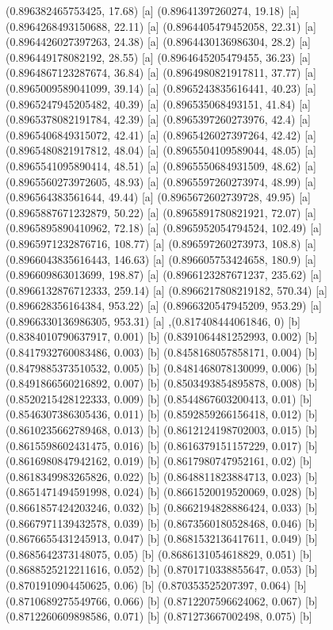 {{{(0.896382465753425, 17.68) [a] 
(0.89641397260274, 19.18) [a] 
(0.8964268493150688, 22.11) [a] 
(0.8964405479452058, 22.31) [a] 
(0.8964426027397263, 24.38) [a] 
(0.8964430136986304, 28.2) [a] 
(0.896449178082192, 28.55) [a] 
(0.8964645205479455, 36.23) [a] 
(0.8964867123287674, 36.84) [a] 
(0.8964980821917811, 37.77) [a] 
(0.8965009589041099, 39.14) [a] 
(0.8965243835616441, 40.23) [a] 
(0.8965247945205482, 40.39) [a] 
(0.896535068493151, 41.84) [a] 
(0.8965378082191784, 42.39) [a] 
(0.8965397260273976, 42.4) [a] 
(0.8965406849315072, 42.41) [a] 
(0.8965426027397264, 42.42) [a] 
(0.8965480821917812, 48.04) [a] 
(0.8965504109589044, 48.05) [a] 
(0.8965541095890414, 48.51) [a] 
(0.8965550684931509, 48.62) [a] 
(0.8965560273972605, 48.93) [a] 
(0.8965597260273974, 48.99) [a] 
(0.896564383561644, 49.44) [a] 
(0.8965672602739728, 49.95) [a] 
(0.8965887671232879, 50.22) [a] 
(0.8965891780821921, 72.07) [a] 
(0.8965895890410962, 72.18) [a] 
(0.8965952054794524, 102.49) [a] 
(0.8965971232876716, 108.77) [a] 
(0.896597260273973, 108.8) [a] 
(0.8966043835616443, 146.63) [a] 
(0.896605753424658, 180.9) [a] 
(0.896609863013699, 198.87) [a] 
(0.8966123287671237, 235.62) [a] 
(0.8966132876712333, 259.14) [a] 
(0.8966217808219182, 570.34) [a] 
(0.896628356164384, 953.22) [a] 
(0.8966320547945209, 953.29) [a] 
(0.8966330136986305, 953.31) [a] 
},{(0.817408444061846, 0) [b] 
(0.8384010790637917, 0.001) [b] 
(0.8391064481252993, 0.002) [b] 
(0.8417932760083486, 0.003) [b] 
(0.8458168057858171, 0.004) [b] 
(0.8479885373510532, 0.005) [b] 
(0.8481468078130099, 0.006) [b] 
(0.8491866560216892, 0.007) [b] 
(0.8503493854895878, 0.008) [b] 
(0.8520215428122333, 0.009) [b] 
(0.8544867603200413, 0.01) [b] 
(0.8546307386305436, 0.011) [b] 
(0.8592859266156418, 0.012) [b] 
(0.8610235662789468, 0.013) [b] 
(0.8612124198702003, 0.015) [b] 
(0.8615598602431475, 0.016) [b] 
(0.8616379151157229, 0.017) [b] 
(0.8616980847942162, 0.019) [b] 
(0.8617980747952161, 0.02) [b] 
(0.8618349983265826, 0.022) [b] 
(0.8648811823884713, 0.023) [b] 
(0.8651471494591998, 0.024) [b] 
(0.8661520019520069, 0.028) [b] 
(0.8661857424203246, 0.032) [b] 
(0.8662194828886424, 0.033) [b] 
(0.8667971139432578, 0.039) [b] 
(0.8673560180528468, 0.046) [b] 
(0.8676655431245913, 0.047) [b] 
(0.8681532136417611, 0.049) [b] 
(0.8685642373148075, 0.05) [b] 
(0.8686131054618829, 0.051) [b] 
(0.8688525212211616, 0.052) [b] 
(0.8701710338855647, 0.053) [b] 
(0.8701910904450625, 0.06) [b] 
(0.870353525207397, 0.064) [b] 
(0.8710689275549766, 0.066) [b] 
(0.8712207596624062, 0.067) [b] 
(0.8712260609898586, 0.071) [b] 
(0.871273667002498, 0.075) [b] 
}}}

